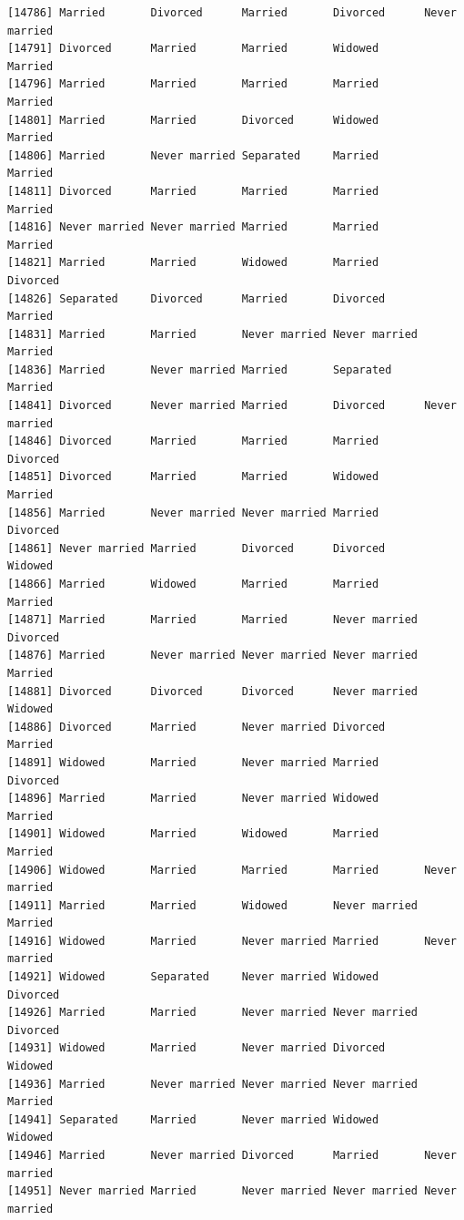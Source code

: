\documentclass[
  letterpaper,
  DIV=11,
  numbers=noendperiod,
  oneside]{scrartcl}
\begin{document}
\begin{verbatim}
[14786] Married       Divorced      Married       Divorced      Never married
[14791] Divorced      Married       Married       Widowed       Married      
[14796] Married       Married       Married       Married       Married      
[14801] Married       Married       Divorced      Widowed       Married      
[14806] Married       Never married Separated     Married       Married      
[14811] Divorced      Married       Married       Married       Married      
[14816] Never married Never married Married       Married       Married      
[14821] Married       Married       Widowed       Married       Divorced     
[14826] Separated     Divorced      Married       Divorced      Married      
[14831] Married       Married       Never married Never married Married      
[14836] Married       Never married Married       Separated     Married      
[14841] Divorced      Never married Married       Divorced      Never married
[14846] Divorced      Married       Married       Married       Divorced     
[14851] Divorced      Married       Married       Widowed       Married      
[14856] Married       Never married Never married Married       Divorced     
[14861] Never married Married       Divorced      Divorced      Widowed      
[14866] Married       Widowed       Married       Married       Married      
[14871] Married       Married       Married       Never married Divorced     
[14876] Married       Never married Never married Never married Married      
[14881] Divorced      Divorced      Divorced      Never married Widowed      
[14886] Divorced      Married       Never married Divorced      Married      
[14891] Widowed       Married       Never married Married       Divorced     
[14896] Married       Married       Never married Widowed       Married      
[14901] Widowed       Married       Widowed       Married       Married      
[14906] Widowed       Married       Married       Married       Never married
[14911] Married       Married       Widowed       Never married Married      
[14916] Widowed       Married       Never married Married       Never married
[14921] Widowed       Separated     Never married Widowed       Divorced     
[14926] Married       Married       Never married Never married Divorced     
[14931] Widowed       Married       Never married Divorced      Widowed      
[14936] Married       Never married Never married Never married Married      
[14941] Separated     Married       Never married Widowed       Widowed      
[14946] Married       Never married Divorced      Married       Never married
[14951] Never married Married       Never married Never married Never married

\end{verbatim}
\end{document}

